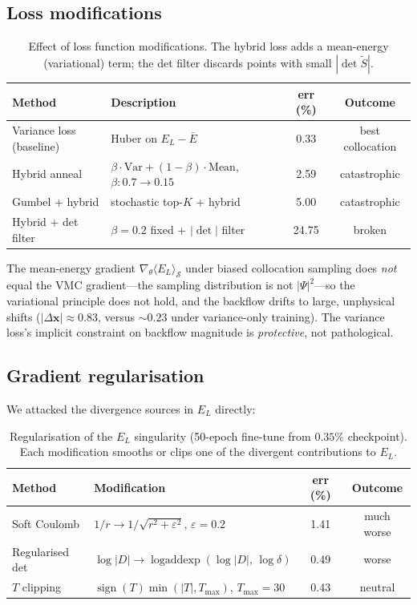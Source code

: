 \subsection{Loss modifications}
\label{app:catch22:loss}

\begin{table}[htbp]
\centering
\caption[Effect of loss-function modifications]{Effect of loss function modifications.
The hybrid loss adds a mean-energy (variational) term;
the det filter discards points with small $|\det\tilde S|$.}
\label{tab:c22:loss}
\begin{tabular}{l l c c}
\toprule
Method & Description & err (\%) & Outcome \\
\midrule
Variance loss (baseline) & Huber on $E_L-\bar E$ & 0.33 & best collocation \\
Hybrid anneal & $\beta\cdot\text{Var}+(1{-}\beta)\cdot\text{Mean}$,
  $\beta\!:\!0.7{\to}0.15$ & 2.59 & catastrophic \\
Gumbel + hybrid & stochastic top-$K$ + hybrid & 5.00 & catastrophic \\
Hybrid + det filter & $\beta{=}0.2$ fixed + $|\det|$ filter & 24.75 & broken \\
\bottomrule
\end{tabular}
\end{table}

The mean-energy gradient $\nabla_\theta\langle E_L\rangle_{\mathcal S}$
under biased collocation sampling does \emph{not} equal the VMC gradient---the
sampling distribution is not $|\Psi|^2$---so the variational principle
does not hold, and the backflow drifts to large,
unphysical shifts ($|\Delta\mathbf x|\approx 0.83$, versus ${\sim}0.23$
under variance-only training).
The variance loss's implicit constraint on backflow magnitude is
\emph{protective}, not pathological.

\subsection{Gradient regularisation}
\label{app:catch22:regularisation}

We attacked the divergence sources in $E_L$ directly:

\begin{table}[htbp]
\centering
\caption[Regularisation of the $E_L$ singularity]{Regularisation of the $E_L$ singularity (50-epoch
fine-tune from $0.35\%$ checkpoint). Each modification smooths or clips
one of the divergent contributions to $E_L$.}
\label{tab:c22:reg}
\begin{tabular}{l l c c}
\toprule
Method & Modification & err (\%) & Outcome \\
\midrule
Soft Coulomb & $1/r\to 1/\sqrt{r^2+\varepsilon^2}$,
  $\varepsilon{=}0.2$ & 1.41 & much worse \\
Regularised det & $\log|D|\to\operatorname{logaddexp}(\log|D|,\,
  \log\delta)$ & 0.49 & worse \\
$T$ clipping & $\operatorname{sign}(T)\min(|T|,T_{\max})$,
  $T_{\max}{=}30$ & 0.43 & neutral \\
\bottomrule
\end{tabular}
\end{table}

